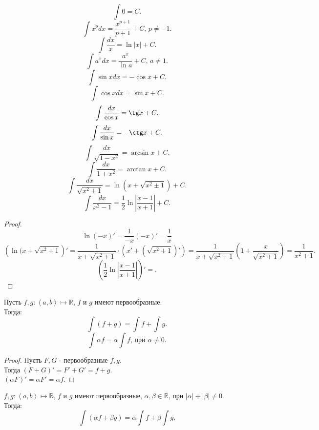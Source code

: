 \documentclass[11pt, oneside]{article}   	%
\begin{document}
         \begin{theorem}
             \[ \int 0 = C .\]
             \[ \int x^{p}dx = \frac{x^{p+1}}{p+1} + C \text{, $p \neq -1$} .\]
             \[ \int \frac{dx}{x} = \ln |x| + C.\]
             \[ \int a^{x}dx = \frac{a^{x}}{\ln a} + C \text{, $a \neq 1$}.\]
             \[ \int \sin x dx = -\cos x + C .\]
             \[ \int \cos x dx = \sin x + C .\] 
            \[ \int \frac{dx}{\cos x} = \tg x + C .\]
            \[ \int \frac{dx}{\sin x} = -\ctg x + C .\]
            \[ \int \frac{dx}{\sqrt{1-x^2} } = \arcsin x + C .\]
            \[ \int \frac{dx}{1+x^2} = \arctan x + C .\]
            \[ \int \frac{dx}{\sqrt{x^2\pm 1} } = \ln(x+\sqrt{x^2\pm 1}) + C  .\]
            \[ \int \frac{dx}{x^2-1} = \frac{1}{2}\ln\left|\frac{x-1}{x+1}\right| + C .\]
            \begin{proof}
                \[ \ln(-x)' = \frac{1}{-x}(-x)' = \frac{1}{x} \]
                \[ \left( \ln(x+\sqrt{x^2+1}  \right)' = \frac{1}{x+\sqrt{x^2+1} }\cdot (x'  + (\sqrt{x^2+1})') = \frac{1}{x+\sqrt{x^2+1} }\left(1 + \frac{x}{\sqrt{x^2+1} }\right) = \frac{1}{x^2+1}  .\]
                \[ \left( \frac{1}{2}\ln\left|\frac{x-1}{x+1}\right| \right)' =   .\] 
            \end{proof}
         \end{theorem}
         \begin{theorem}
            Пусть $f, g : \left<a, b\right> \mapsto \mathbb{R}$, $f$ и $g$ имеют первообразные.\\
            Тогда:
            \[ \int (f+g) = \int f + \int g .\]
            \[ \int \alpha f = \alpha \int f \text{, при $\alpha \neq 0$} .\]
            \begin{proof}
                Пусть $F, G$ - первообразные $f,g$.\\
                Тогда $(F+G)' = F'+G' = f+g$.\\
                $(\alpha F)' = \alpha F' = \alpha f$.
            \end{proof}
         \end{theorem}
         \begin{tlemma}
             $f, g : \left<a, b\right> \mapsto \mathbb{R}$, $f$ и $g$ имеют первообразные, $\alpha, \beta\in \mathbb{R}$, при $|\alpha| + |\beta| \neq 0$.\\
             Тогда:
             \[ \int (\alpha f + \beta g) = \alpha\int f + \beta \int g .\]
         \end{tlemma}
\end{document}
